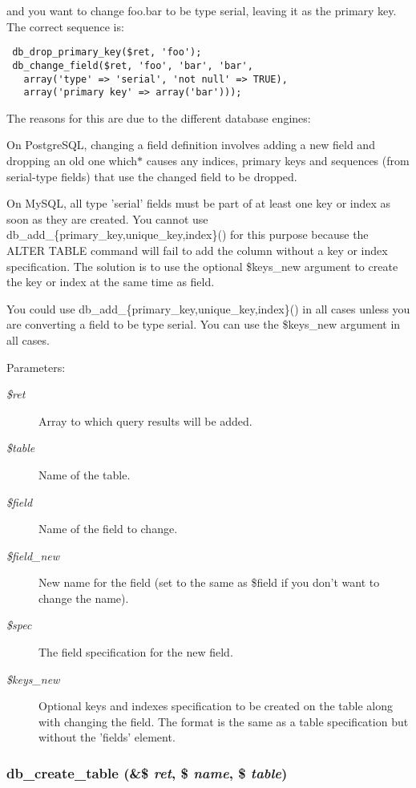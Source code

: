  and you want to change foo.bar to be type serial, leaving it as the primary key. The correct sequence is: 

\begin{Code}\begin{verbatim} db_drop_primary_key($ret, 'foo');
 db_change_field($ret, 'foo', 'bar', 'bar',
   array('type' => 'serial', 'not null' => TRUE),
   array('primary key' => array('bar')));
\end{verbatim}
\end{Code}



The reasons for this are due to the different database engines:

On PostgreSQL, changing a field definition involves adding a new field and dropping an old one which$\ast$ causes any indices, primary keys and sequences (from serial-type fields) that use the changed field to be dropped.

On MySQL, all type 'serial' fields must be part of at least one key or index as soon as they are created. You cannot use db\_\-add\_\-\{primary\_\-key,unique\_\-key,index\}() for this purpose because the ALTER TABLE command will fail to add the column without a key or index specification. The solution is to use the optional \$keys\_\-new argument to create the key or index at the same time as field.

You could use db\_\-add\_\-\{primary\_\-key,unique\_\-key,index\}() in all cases unless you are converting a field to be type serial. You can use the \$keys\_\-new argument in all cases.

\begin{Desc}
\item[Parameters:]
\begin{description}
\item[{\em \$ret}]Array to which query results will be added. \item[{\em \$table}]Name of the table. \item[{\em \$field}]Name of the field to change. \item[{\em \$field\_\-new}]New name for the field (set to the same as \$field if you don't want to change the name). \item[{\em \$spec}]The field specification for the new field. \item[{\em \$keys\_\-new}]Optional keys and indexes specification to be created on the table along with changing the field. The format is the same as a table specification but without the 'fields' element. \end{description}
\end{Desc}
\hypertarget{group__schemaapi_gb7a73e88621851e4bed62fd6063eb2f9}{
\subsubsection[{db\_\-create\_\-table}]{\setlength{\rightskip}{0pt plus 5cm}db\_\-create\_\-table (\&\$ {\em ret}, \/  \$ {\em name}, \/  \$ {\em table})}}
\label{group__schemaapi_gb7a73e88621851e4bed62fd6063eb2f9}


